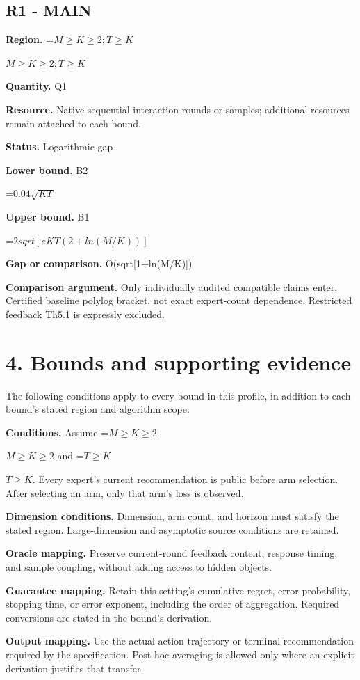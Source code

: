\documentclass[10pt,a4paper]{article}
\newcommand{\AtlasMath}[1]{\par\begingroup\centering\setbox0=\hbox{$\displaystyle #1$}\ifdim\wd0>1.4\linewidth\typeout{ATLAS WIDE FORMULA: \the\wd0}\fi\ifdim\wd0>\linewidth\resizebox{\linewidth}{!}{\box0}\else\box0\fi\par\endgroup}
\newcommand{\AtlasInlineMath}[1]{\begingroup\setbox0=\hbox{$#1$}\ifdim\wd0>.4\linewidth\endgroup\AtlasMath{#1}\else\endgroup$#1$\fi}
\begin{document}
\subsection{R1 - MAIN}
\textbf{Region.} \AtlasInlineMath{M\ge K\ge 2; T\ge K}

\textbf{Quantity.} Q1

\textbf{Resource.} Native sequential interaction rounds or samples; additional resources remain attached to each bound.

\textbf{Status.} Logarithmic gap

\textbf{Lower bound.} B2

\AtlasMath{0.04\sqrt{KT}}
\textbf{Upper bound.} B1

\AtlasMath{2sqrt[eKT(2+ln(M/K))]}
\textbf{Gap or comparison.} O(sqrt[1+ln(M/K)])

\textbf{Comparison argument.} Only individually audited compatible claims enter. Certified baseline polylog bracket, not exact expert-count dependence. Restricted feedback Th5.1 is expressly excluded.

\section{4. Bounds and supporting evidence}
The following conditions apply to every bound in this profile, in addition to each bound's stated region and algorithm scope.

\textbf{Conditions.} Assume \AtlasInlineMath{M\ge K\ge2} and \AtlasInlineMath{T\ge K}. Every expert's current recommendation is public before arm selection. After selecting an arm, only that arm's loss is observed.

\textbf{Dimension conditions.} Dimension, arm count, and horizon must satisfy the stated region. Large-dimension and asymptotic source conditions are retained.

\textbf{Oracle mapping.} Preserve current-round feedback content, response timing, and sample coupling, without adding access to hidden objects.

\textbf{Guarantee mapping.} Retain this setting's cumulative regret, error probability, stopping time, or error exponent, including the order of aggregation. Required conversions are stated in the bound's derivation.

\textbf{Output mapping.} Use the actual action trajectory or terminal recommendation required by the specification. Post-hoc averaging is allowed only where an explicit derivation justifies that transfer.
\end{document}
